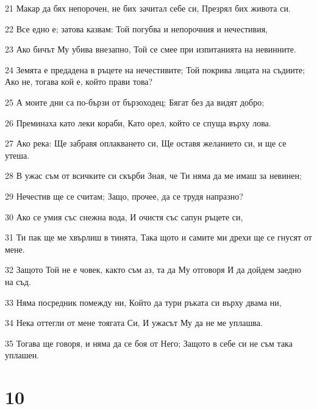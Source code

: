 \par 21 Макар да бях непорочен, не бих зачитал себе си, Презрял бих живота си.
\par 22 Все едно е; затова казвам: Той погубва и непорочния и нечестивия,
\par 23 Ако бичът Му убива внезапно, Той се смее при изпитанията на невинните.
\par 24 Земята е предадена в ръцете на нечестивите; Той покрива лицата на съдиите; Ако не, тогава кой е, който прави това?
\par 25 А моите дни са по-бързи от бързоходец; Бягат без да видят добро;
\par 26 Преминаха като леки кораби, Като орел, който се спуща върху лова.
\par 27 Ако река: Ще забравя оплакването си, Ще оставя желанието си, и ще се утеша.
\par 28 В ужас съм от всичките си скърби Зная, че Ти няма да ме имаш за невинен;
\par 29 Нечестив ще се считам; Защо, прочее, да се трудя напразно?
\par 30 Ако се умия със снежна вода, И очистя със сапун ръцете си,
\par 31 Ти пак ще ме хвърлиш в тинята, Така щото и самите ми дрехи ще се гнусят от мене.
\par 32 Защото Той не е човек, както съм аз, та да Му отговоря И да дойдем заедно на съд.
\par 33 Няма посредник помежду ни, Който да тури ръката си върху двама ни,
\par 34 Нека оттегли от мене тоягата Си, И ужасът Му да не ме уплашва.
\par 35 Тогава ще говоря, и няма да се боя от Него; Защото в себе си не съм така уплашен.

\chapter{10}

